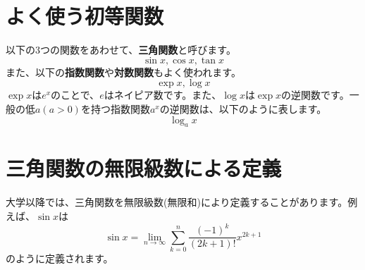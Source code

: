 \documentclass{ltjsarticle}
\begin{document}
\section{よく使う初等関数}
以下の3つの関数をあわせて、\textbf{三角関数}と呼びます。
\[ \sin{x}, \cos{x}, \tan{x} \]
また、以下の\textbf{指数関数}や\textbf{対数関数}もよく使われます。
\[ \exp{x}, \log{x} \]
$\exp{x}$は$e^x$のことで、$e$はネイピア数です。また、$\log{x}$は$\exp{x}$の逆関数です。一般の低$a(a>0)$を持つ指数関数$a^x$の逆関数は、以下のように表します。
\[ \log_{a}{x} \]

\section{三角関数の無限級数による定義}
大学以降では、三角関数を無限級数(無限和)により定義することがあります。例えば、$\sin{x}$は
\[ \sin{x} = \lim_{n \to \infty} \sum_{k=0}^{n} \frac{(-1)^{k}} {(2k+1)!} x^{2k+1} \]
のように定義されます。
\end{document}

